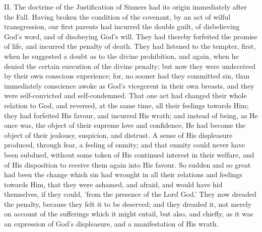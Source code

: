 \documentclass[
]{book}
\begin{document}
II. The doctrine of the Justification of Sinners had its origin immediately after the Fall. Having broken the condition of the covenant, by an act of wilful transgression, our first parents had incurred the double guilt, of disbelieving God's word, and of disobeying God's will. They had thereby forfeited the promise of life, and incurred the penalty of death. They had listened to the tempter, first, when he suggested a doubt as to the divine prohibition, and again, when he denied the certain execution of the divine penalty; but now they were undeceived by their own conscious experience; for, no sooner had they committed sin, than immediately conscience awoke as God's vicegerent in their own breasts, and they were self-convicted and self-condemned. That one act had changed their whole relation to God, and reversed, at the same time, all their feelings towards Him; they had forfeited His favour, and incurred His wrath; and instead of being, as He once was, the object of their supreme love and confidence, He had become the object of their jealousy, suspicion, and distrust. A sense of His displeasure produced, through fear, a feeling of enmity; and that enmity could never have been subdued, without some token of His continued interest in their welfare, and of His disposition to receive them again into His favour. So sudden and so great had been the change which sin had wrought in all their relations and feelings towards Him, that they were ashamed, and afraid, and would have hid themselves, if they could, 'from the presence of the Lord God.' They now dreaded the penalty, because they felt it to be deserved; and they dreaded it, not merely on account of the sufferings which it might entail, but also, and chiefly, as it was an expression of God's displeasure, and a manifestation of His wrath.
\end{document}
